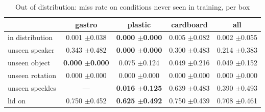 \begin{table}
\caption{Out of distribution: miss rate on conditions never seen in training, per box}
\label{tab:ood_miss}
\begin{tabular}{l!{\vrule width 1.2pt}ccc!{\vrule width 1.2pt}c}
\toprule
 & gastro & plastic & cardboard & all \\
\midrule
in distribution & 0.001 {\scriptsize $\pm$0.038} & \bfseries 0.000 {\scriptsize $\pm$0.000} & 0.005 {\scriptsize $\pm$0.082} & 0.002 {\scriptsize $\pm$0.055} \\
unseen speaker & 0.343 {\scriptsize $\pm$0.482} & \bfseries 0.000 {\scriptsize $\pm$0.000} & 0.300 {\scriptsize $\pm$0.483} & 0.214 {\scriptsize $\pm$0.383} \\
unseen object & \bfseries 0.000 {\scriptsize $\pm$0.000} & 0.075 {\scriptsize $\pm$0.124} & 0.049 {\scriptsize $\pm$0.216} & 0.049 {\scriptsize $\pm$0.152} \\
unseen rotation & 0.000 {\scriptsize $\pm$0.000} & 0.000 {\scriptsize $\pm$0.000} & 0.000 {\scriptsize $\pm$0.000} & 0.000 {\scriptsize $\pm$0.000} \\
unseen speckles & — & \bfseries 0.016 {\scriptsize $\pm$0.125} & 0.639 {\scriptsize $\pm$0.483} & 0.390 {\scriptsize $\pm$0.493} \\
lid on & 0.750 {\scriptsize $\pm$0.452} & \bfseries 0.625 {\scriptsize $\pm$0.492} & 0.750 {\scriptsize $\pm$0.439} & 0.708 {\scriptsize $\pm$0.461} \\
\bottomrule
\end{tabular}
\end{table}
